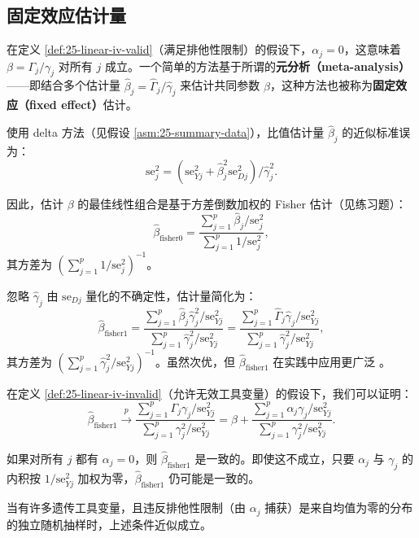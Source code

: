 \subsection{固定效应估计量}\label{sec:25-fixed-effect}

在定义 \ref{def:25-linear-iv-valid}（满足排他性限制）的假设下，$\alpha_j = 0$，这意味着 $\beta = \Gamma_j / \gamma_j$ 对所有 $j$ 成立。一个简单的方法基于所谓的\textbf{元分析（meta-analysis）}——即结合多个估计量 $\hat\beta_j = \hat\Gamma_j / \hat\gamma_j$ 来估计共同参数 $\beta$，这种方法也被称为\textbf{固定效应（fixed effect）}估计。

使用 delta 方法（见假设 \ref{asm:25-summary-data}），比值估计量 $\hat\beta_j$ 的近似标准误为：
\[
\mathrm{se}_j^2 = (\mathrm{se}_{Yj}^2 + \hat\beta_j^2 \mathrm{se}_{Dj}^2) / \hat\gamma_j^2. \tag{25.11}
\]

因此，估计 $\beta$ 的最佳线性组合是基于方差倒数加权的 Fisher 估计（见练习题）：
\[
\hat\beta_{\mathrm{fisher0}} = \frac{\sum_{j=1}^p \hat\beta_j / \mathrm{se}_j^2}{\sum_{j=1}^p 1 / \mathrm{se}_j^2}, \tag{25.12}
\]
其方差为 $\left(\sum_{j=1}^p 1 / \mathrm{se}_j^2\right)^{-1}$。

忽略 $\hat\gamma_j$ 由 $\mathrm{se}_{Dj}$ 量化的不确定性，估计量简化为：
\[
\hat\beta_{\mathrm{fisher1}} = \frac{\sum_{j=1}^p \hat\beta_j \hat\gamma_j^2 / \mathrm{se}_{Yj}^2}{\sum_{j=1}^p \hat\gamma_j^2 / \mathrm{se}_{Yj}^2} = \frac{\sum_{j=1}^p \hat\Gamma_j \hat\gamma_j / \mathrm{se}_{Yj}^2}{\sum_{j=1}^p \hat\gamma_j^2 / \mathrm{se}_{Yj}^2}, \tag{25.13}
\]
其方差为 $\left(\sum_{j=1}^p \hat\gamma_j^2 / \mathrm{se}_{Yj}^2\right)^{-1}$。虽然次优，但 $\hat\beta_{\mathrm{fisher1}}$ 在实践中应用更广泛 \citep{Bowden2018}。

在定义 \ref{def:25-linear-iv-invalid}（允许无效工具变量）的假设下，我们可以证明：
\[
\hat\beta_{\mathrm{fisher1}} \xrightarrow{p} \frac{\sum_{j=1}^p \Gamma_j \gamma_j / \mathrm{se}_{Yj}^2}{\sum_{j=1}^p \gamma_j^2 / \mathrm{se}_{Yj}^2} = \beta + \frac{\sum_{j=1}^p \alpha_j \gamma_j / \mathrm{se}_{Yj}^2}{\sum_{j=1}^p \gamma_j^2 / \mathrm{se}_{Yj}^2}. \tag{25.14}
\]

如果对所有 $j$ 都有 $\alpha_j = 0$，则 $\hat\beta_{\mathrm{fisher1}}$ 是一致的。即使这不成立，只要 $\alpha_j$ 与 $\gamma_j$ 的内积按 $1 / \mathrm{se}_{Yj}^2$ 加权为零，$\hat\beta_{\mathrm{fisher1}}$ 仍可能是一致的。

\begin{Remark}
当有许多遗传工具变量，且违反排他性限制（由 $\alpha_j$ 捕获）是来自均值为零的分布的独立随机抽样时，上述条件近似成立。
\end{Remark}

